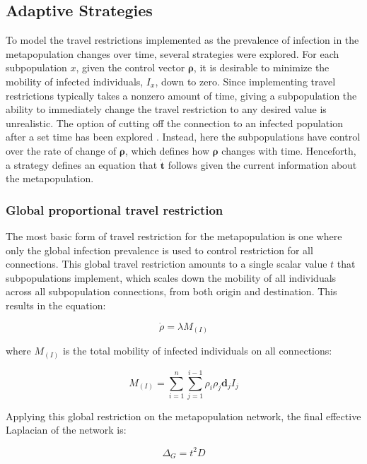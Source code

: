 \subsection{Adaptive Strategies}
To model the travel restrictions implemented as the prevalence of infection in the metapopulation changes over time, several strategies were explored. For each subpopulation $x$, given the control vector $\mathbf{\rho}$, it is desirable to minimize the mobility of infected individuals, $I_{x}$, down to zero. Since implementing travel restrictions typically takes a nonzero amount of time, giving a subpopulation the ability to immediately change the travel restriction to any desired value is unrealistic. The option of cutting off the connection to an infected population after a set time has been explored \cite{feng2020infectious}. Instead, here the subpopulations have control over the rate of change of $\mathbf{\rho}$, which defines how $\mathbf{\rho}$ changes with time. Henceforth, a strategy defines an equation that $\mathbf{\dot{t}}$ follows given the current information about the metapopulation.\\

\subsubsection{Global proportional travel restriction}
The most basic form of travel restriction for the metapopulation is one where only the global infection prevalence is used to control restriction for all connections. This global travel restriction amounts to a single scalar value $t$ that subpopulations implement, which scales down the mobility of all individuals across all subpopulation connections, from both origin and destination. This results in the equation:

\begin{equation}
\dot{\rho} = \lambda M_{(I)}
\end{equation}

where $M_{(I)}$ is the total mobility of infected individuals on all connections:

\begin{equation}
M_{(I)} = \sum_{i=1}^{n} \sum_{j=1}^{i-1} \rho_{i} \rho_{j} \mathbf{d}_{j} I_{j}
\end{equation}

Applying this global restriction on the metapopulation network, the final effective Laplacian of the network is:

\begin{equation}
\Delta_G = t^2 D
\end{equation}

